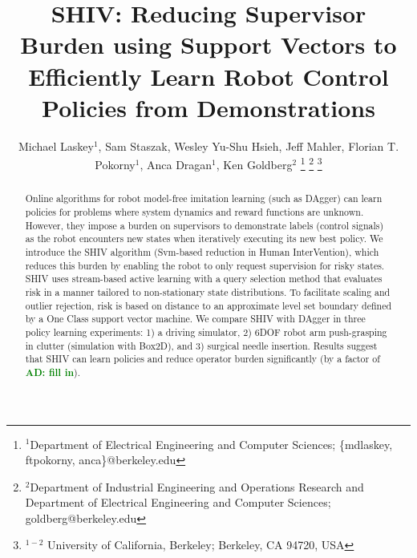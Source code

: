 \documentclass[10pt, conference]{ieeeconf}      %
\title{SHIV: Reducing Supervisor Burden using Support Vectors to Efficiently Learn Robot Control Policies from Demonstrations}
\author{Michael Laskey$^1$, Sam Staszak, Wesley Yu-Shu Hsieh, Jeff Mahler, Florian T. Pokorny$^1$, Anca Dragan$^1$, Ken Goldberg$^2$%
\thanks{$^1$Department of Electrical Engineering and Computer Sciences; {\small \{mdlaskey, ftpokorny, anca\}@berkeley.edu}}%
\thanks{$^2$Department of Industrial Engineering and Operations Research and Department of Electrical Engineering and Computer Sciences; {\small goldberg@berkeley.edu}}%
\thanks{$^{1-2}$ University of California, Berkeley;  Berkeley, CA 94720, USA}%
}
\newcommand{\adnote}[1]{\ifthenelse{\boolean{include-notes}}%
 {\textcolor{green}{\textbf{AD: #1}}}{}}
\begin{document}
\maketitle
\thispagestyle{empty}
\pagestyle{empty}



\begin{abstract}
Online algorithms for robot model-free imitation learning (such as DAgger) can learn policies for problems where system dynamics and reward functions are unknown. However, they impose a burden on supervisors to demonstrate labels (control signals) as the robot encounters new states when iteratively executing its new best policy. We introduce the SHIV algorithm (Svm-based reduction in Human InterVention), which reduces this burden by enabling the robot to only request supervision for risky states. SHIV uses stream-based active learning with a query selection method that evaluates risk in a manner tailored to non-stationary state distributions.  To facilitate scaling and outlier rejection, risk is based on distance to an approximate level set boundary defined by a One Class support vector machine.  We compare SHIV with DAgger in three policy learning experiments: 1) a driving simulator, 2) 6DOF robot arm push-grasping in clutter (simulation with Box2D), and 3) surgical needle insertion.  Results suggest that SHIV can learn policies and reduce operator burden significantly  (by a factor of \adnote{fill in}).%





\end{abstract}
\end{document}
